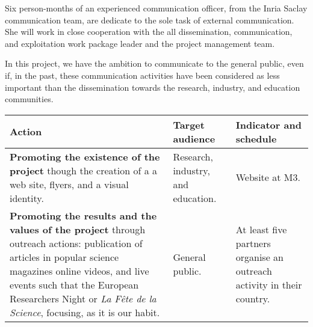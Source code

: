 Six person-months of an experienced communication officer, from the
Inria Saclay communication team, are dedicate to the sole task of
external communication.  She will work in close cooperation with the
all dissemination, communication, and exploitation work package leader
and the project management team.

In this project, we have the ambition to communicate to the general
public, even if, in the past, these communication activities have been
considered as less important than the dissemination towards the
research, industry, and education communities.

\begin{longtable}{|p{}|p{}|p{}|}
\hline
{\bf Action}
&
{\bf Target audience}
&
{\bf Indicator and schedule}
\\
\hline
{\bf Promoting the existence of the project}
though the creation of a a web site, flyers, and 
a visual identity. 
&
Research, industry, and education.
&
Website at M3.
\\
\hline
{\bf Promoting the results and the values of the project} through 
outreach actions: 
publication of articles in  popular science magazines
online videos, and live events such that the
European Researchers Night or {\em La Fête de la Science}, 
focusing, as it is our habit. 
&
General public.
&
At least five partners organise an outreach activity in their country.
\\
\hline
\end{longtable}

